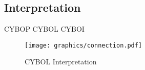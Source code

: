 %
%
%
%
%
%

\subsection{Interpretation}
\label{inerpretation_heading}

CYBOP
CYBOL
CYBOI

\begin{figure}[ht]
    \begin{center}
        \texttt{[image: graphics/connection.pdf]}
        \caption{CYBOL Interpretation}
        \label{cybol_interpretation_figure}
    \end{center}
\end{figure}
